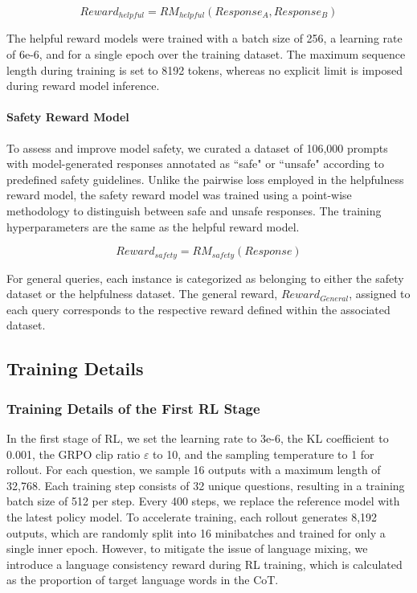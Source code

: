 \begin{equation} 
    Reward_{helpful} = RM_{helpful}(Response_A, Response_B)
\end{equation}

The helpful reward models were trained with a batch size of 256, a learning rate of 6e-6, and for a single epoch over the training dataset. The maximum sequence length during training is set to 8192 tokens, whereas no explicit limit is imposed during reward model inference. 

\paragraph{Safety Reward Model} To assess and improve model safety, we curated a dataset of 106,000 prompts with model-generated responses annotated as ``safe" or ``unsafe" according to predefined safety guidelines. Unlike the pairwise loss employed in the helpfulness reward model, the safety reward model was trained using a point-wise methodology to distinguish between safe and unsafe responses. The training hyperparameters are the same as the helpful reward model.

\begin{equation}
    Reward_{safety} = RM_{safety}(Response)
\end{equation}

For general queries, each instance is categorized as belonging to either the safety dataset or the helpfulness dataset. The general reward, $Reward_{General}$, assigned to each query corresponds to the respective reward defined within the associated dataset. 

\subsection{Training Details}

\label{sec:rl-detail}
\subsubsection{Training Details of the First RL Stage} \label{sec: r1-1-rl}

In the first stage of RL, we set the learning rate to 3e-6, the KL coefficient to 0.001, the GRPO clip ratio $\varepsilon$ to 10, and the sampling temperature to 1 for rollout. For each question, we sample 16 outputs with a maximum length of 32,768. Each training step consists of 32 unique questions, resulting in a training batch size of 512 per step. Every 400 steps, we replace the reference model with the latest policy model. To accelerate training, each rollout generates 8,192 outputs, which are randomly split into 16 minibatches and trained for only a single inner epoch. However, to mitigate the issue of language mixing, we introduce a language consistency reward during RL training, which is calculated as the proportion of target language words in the CoT.

